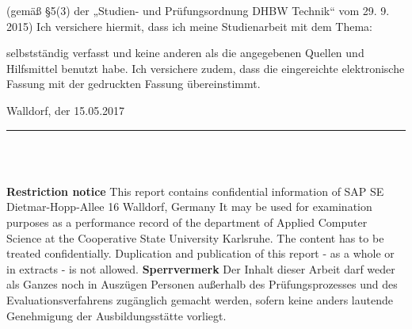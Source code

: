 \begin{spacing}{1.0}
(gemäß §5(3) der „Studien- und Prüfungsordnung DHBW Technik“ vom 29. 9. 2015)
Ich versichere hiermit, dass ich meine Studienarbeit mit dem Thema: 
\begin{quote}
	\textit{\titel} 
\end{quote}  
selbstständig verfasst und keine anderen als die angegebenen Quellen und Hilfsmittel benutzt habe. Ich versichere zudem, dass die eingereichte elektronische Fassung mit der gedruckten Fassung übereinstimmt. \\

\newline

Walldorf, der 15.05.2017 \\[4ex]

\rule[-0.2cm]{5cm}{0.5pt} \\

\textsc{\autor} \\[10ex]
\end{spacing}

\newpage 

{\bfseries Restriction notice} \newline
This report contains confidential information of \newline
SAP SE \newline
Dietmar-Hopp-Allee 16  Walldorf, Germany \newline
It may be used for examination purposes as a performance record of the department
of Applied Computer Science at the Cooperative State University Karlsruhe.
The content has to be treated confidentially. \newline
Duplication and publication of this report - as a whole or in extracts - is not
allowed. \newline
\vskip 1cm
\textbf{Sperrvermerk} \newline
Der Inhalt dieser Arbeit darf weder als Ganzes noch in Ausz{\"u}gen Personen 
au{\ss}erhalb des Pr{\"u}fungsprozesses und des Evaluationsverfahrens
zug{\"a}nglich gemacht werden, sofern keine anders lautende Genehmigung der Ausbildungsst{\"a}tte vorliegt.